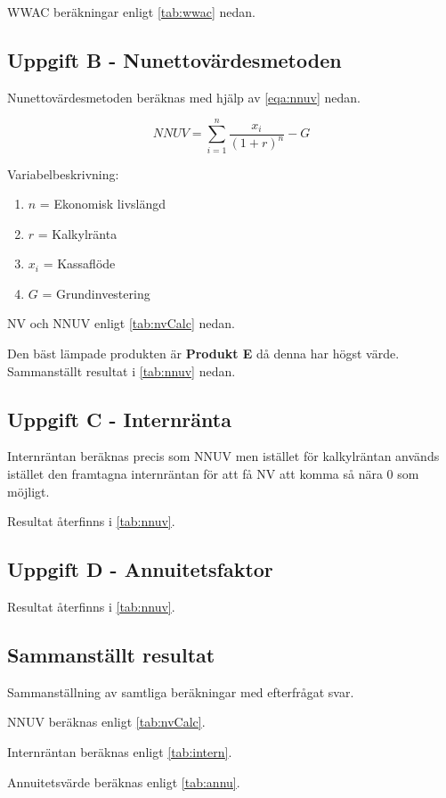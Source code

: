 \documentclass[12pt]{article}
\begin{document}


WWAC beräkningar enligt \cref{tab:wwac} nedan.

\subsection{Uppgift B - Nunettovärdesmetoden}

Nunettovärdesmetoden beräknas med hjälp av \cref{eqa:nnuv} nedan.

\begin{equation} \label{eqa:nnuv}
NNUV = \sum^n_{i=1}\frac{x_i}{(1+r)^n}-G
\end{equation}

\bigskip


Variabelbeskrivning:
\begin{enumerate}
    \item $n$ = Ekonomisk livslängd
    \item $r$ = Kalkylränta
    \item $x_i$ = Kassaflöde
    \item $G$ = Grundinvestering
\end{enumerate}

NV och NNUV enligt \cref{tab:nvCalc} nedan.



Den bäst lämpade produkten är \textbf{Produkt E} då denna har högst värde. Sammanställt resultat i \cref{tab:nnuv} nedan. 


\subsection{Uppgift C - Internränta}
Internräntan beräknas precis som NNUV men istället för kalkylräntan används istället den framtagna internräntan för att få NV att komma så nära 0 som möjligt.




Resultat återfinns i \cref{tab:nnuv}.
\subsection{Uppgift D - Annuitetsfaktor}


Resultat återfinns i \cref{tab:nnuv}.

\subsection{Sammanställt resultat}
Sammanställning av samtliga beräkningar med efterfrågat svar.

NNUV beräknas enligt \cref{tab:nvCalc}.

Internräntan beräknas enligt \cref{tab:intern}.

Annuitetsvärde beräknas enligt \cref{tab:annu}.
\end{document}
